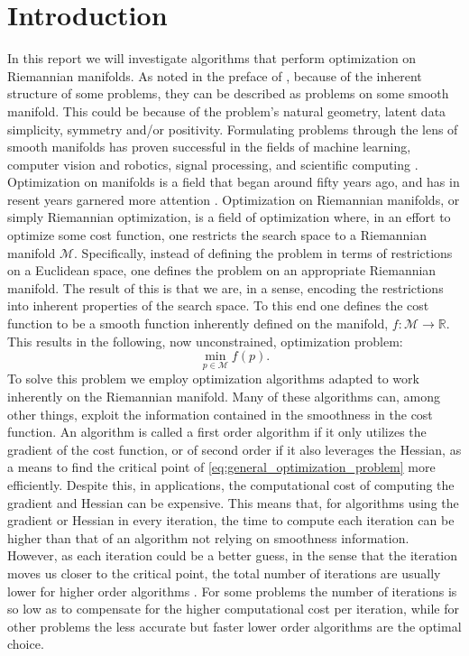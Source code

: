 \section{Introduction}\label{sec:Introduction}

In this report we will investigate algorithms that perform optimization on Riemannian manifolds. As noted in the preface of \cite{Boumal2023}, because of the inherent structure of some problems, they can be described as problems on some smooth manifold. This could be because of the problem's natural geometry, latent data simplicity, symmetry and/or positivity. Formulating problems through the lens of smooth manifolds has proven successful in the fields of machine learning, computer vision and robotics, signal processing, and scientific computing \cite{Boumal2023}. Optimization on manifolds is a field that began around fifty years ago, and has in resent years garnered more attention \cite{Boumal2023}. Optimization on Riemannian manifolds, or simply Riemannian optimization, is a field of optimization where, in an effort to optimize some cost function, one restricts the search space to a Riemannian manifold $\mathcal{M}$. Specifically, instead of defining the problem in terms of restrictions on a Euclidean space, one defines the problem on an appropriate Riemannian manifold. The result of this is that we are, in a sense, encoding the restrictions into inherent properties of the search space. To this end one defines the cost function to be a smooth function inherently defined on the manifold, $f\colon\mathcal{M}\to\mathbb{R}$. This results in the following, now unconstrained, optimization problem:
\begin{equation}\label{eq:general_optimization_problem}
    \min_{p\in\mathcal{M}}f(p).
\end{equation}
To solve this problem we employ optimization algorithms adapted to work inherently on the Riemannian manifold. Many of these algorithms can, among other things, exploit the information contained in the smoothness in the cost function. An algorithm is called a first order algorithm if it only utilizes the gradient of the cost function, or of second order if it also leverages the Hessian, as a means to find the critical point of \eqref{eq:general_optimization_problem} more efficiently. Despite this, in applications, the computational cost of computing the gradient and Hessian can be expensive. This means that, for algorithms using the gradient or Hessian in every iteration, the time to compute each iteration can be higher than that of an algorithm not relying on smoothness information. However, as each iteration could be a better guess, in the sense that the iteration moves us closer to the critical point, the total number of iterations are usually lower for higher order algorithms \cite[p.~119]{Boumal2023}. For some problems the number of iterations is so low as to compensate for the higher computational cost per iteration, while for other problems the less accurate but faster lower order algorithms are the optimal choice. 

